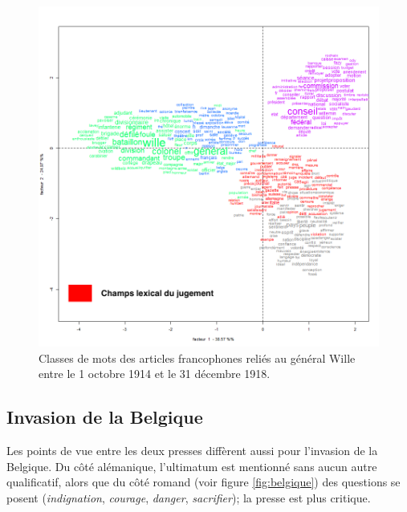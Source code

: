 \documentclass[french,a4paper]{article}
\begin{document}
\begin{figure}[h]
    \centering
    \includegraphics[width=12cm]{imgs/FR/Wille_10classes_mandat.png}
    \caption{Classes de mots des articles francophones reliés au général Wille entre le 1\ier{} octobre 1914 et le 31 décembre 1918.}
    \label{fig:wille14-18}
\end{figure}

\subsection*{Invasion de la Belgique}

Les points de vue entre les deux presses diffèrent aussi pour l'invasion de la Belgique.
Du côté alémanique, l'ultimatum est mentionné sans aucun autre qualificatif, alors que du côté romand (voir figure \ref{fig:belgique}) des questions se posent (\textit{indignation}, \textit{courage}, \textit{danger}, \textit{sacrifier}); la presse est plus critique.
\end{document}
